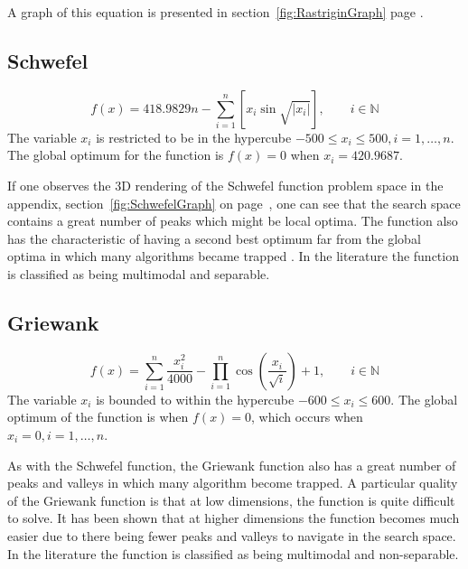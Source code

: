 A graph of this equation is presented in section~\ref{fig:RastriginGraph} page \pageref{fig:RastriginGraph}.
\subsection{Schwefel}
\begin{equation}
	f(x) = 418.9829n - \sum^n_{i=1} [x_i\sin{\sqrt{|x_i|}}], \qquad i \in \mathbb{N}
\end{equation}
The variable $x_i$ is restricted to be in the hypercube $-500 \leq x_i \leq 500, i = 1,\ldots,n$\cite{ABCCompareStudy,numericalABC,HybridIntelliGA,DistributedHierarchicalGA,TestFunctions}. The global optimum for the function is $f(x) = 0$ when $x_i = 420.9687$\cite{ABCCompareStudy,numericalABC,HybridIntelliGA,DistributedHierarchicalGA,TestFunctions}. 

If one observes the 3D rendering of the Schwefel function problem space in the appendix, section~\ref{fig:SchwefelGraph} on page~\pageref{fig:SchwefelGraph}, one can see that the search space contains a great number of peaks which might be local optima. The function also has the characteristic of having a second best optimum far from the global optima in which many algorithms became trapped \cite{ABCCompareStudy,numericalABC,HybridIntelliGA,DistributedHierarchicalGA,TestFunctions}. In the literature the function is classified as being multimodal and separable\cite{ABCCompareStudy,numericalABC,HybridIntelliGA,TestFunctions}.

\subsection{Griewank}
\begin{equation}
	f(x) = \sum^n_{i=1} \frac{x^2_i}{4000} - \prod^n_{i=1}\cos{(\frac{x_i}{\sqrt{i}})} + 1, \qquad i \in \mathbb{N}
\end{equation}
The variable $x_i$ is bounded to within the hypercube $ -600 \leq x_i \leq 600 $\cite{numericalABC,ABCCompareStudy,ARPSO,PerfABC,ContinACSTS,TestFunctions}. The global optimum of the function is when $f(x) =0$, which occurs when $ x_i = 0, i = 1, \dots, n $\cite{numericalABC,ABCCompareStudy,ARPSO,PerfABC,ContinACSTS,TestFunctions}.

As with the Schwefel function, the Griewank function also has a great number of peaks and valleys in which many algorithm become trapped. A particular quality of the Griewank function is that at low dimensions, the function is quite difficult to solve. It has been shown that at higher dimensions the function becomes much easier due to there being fewer peaks and valleys to navigate in the search space\cite{evalevoalgo,ABCCompareStudy,numericalABC,PerfABC,TestFunctions}. In the literature the function is classified as being multimodal and non-separable\cite{adaptPSO,ABCCompareStudy,numericalABC,ChaoticABC,PerfABC,TestFunctions}.

